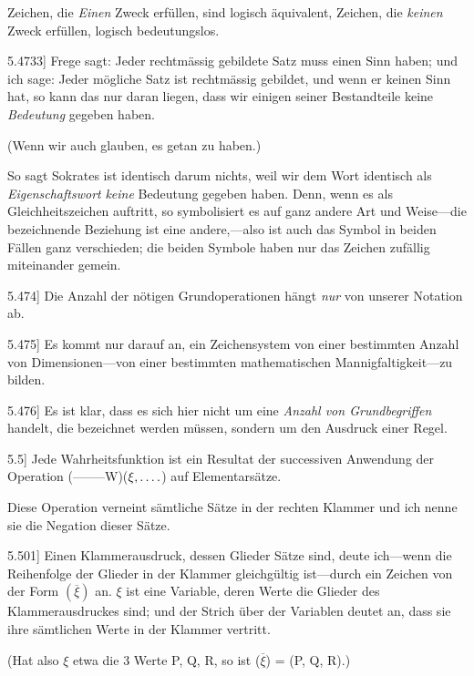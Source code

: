 \documentclass[12pt,oneside]{book}[2007/10/19]
\newcommand{\PropERef}[1]{\hyperref[PropE:#1]{#1}}
\newcommand{\PropositionG}[2]{%
  \item[\phantomsection\label{PropG:#1}\PropERef{#1}] #2%
}
\newcommand{\Emph}[1]{\emph{#1}}%
\newcommand{\fourdots}{\mathinner{\ldotp\ldotp\ldotp\ldotp}}
\newcommand{\AllowBreak}{\discretionary{}{}{}}
\begin{document}
\begin{propositions}
{Zeichen, die \Emph{Einen} Zweck erfüllen, sind logisch
äquivalent, Zeichen, die \Emph{keinen} Zweck erfüllen,
logisch bedeutungslos.}


\PropositionG{5.4733}
{Frege sagt: Jeder rechtmässig gebildete Satz
muss einen Sinn haben; und ich sage: Jeder
mögliche Satz ist rechtmässig gebildet, und wenn er
keinen Sinn hat, so kann das nur daran liegen, dass
wir einigen seiner Bestandteile keine \Emph{Bedeutung}
gegeben haben.

(Wenn wir auch glauben, es getan zu haben.)

So sagt \glqq{}Sokrates ist identisch\grqq{} darum nichts,
weil wir dem Wort \glqq{}identisch\grqq{} als \Emph{Eigenschaftswort}
\Emph{keine} Bedeutung gegeben haben. Denn,
wenn es als Gleichheitszeichen auftritt, so symbolisiert
es auf ganz andere Art und Weise---die
bezeichnende Beziehung ist eine an\-de\-re,---also ist
auch das Symbol in beiden Fällen ganz verschieden;
die beiden Symbole haben nur das Zeichen zufällig
miteinander gemein.}


\PropositionG{5.474}
{Die Anzahl der nötigen Grundoperationen hängt
\Emph{nur} von unserer Notation ab.}


\PropositionG{5.475}
{Es kommt nur darauf an, ein Zeichensystem von
einer bestimmten Anzahl von Dimensionen---von
einer bestimmten mathematischen Man\-nig\-fal\-tig\-keit---zu
bilden.}


\PropositionG{5.476}
{Es ist klar, dass es sich hier nicht um eine
\Emph{Anzahl von Grundbegriffen} handelt, die
bezeichnet werden müssen, sondern um den
Ausdruck einer Regel.}


\PropositionG{5.5}
{Jede Wahrheitsfunktion ist ein Resultat der
successiven Anwendung der Operation \mbox{(--\;--\;--\;--\;--W)}\AllowBreak($\xi, \fourdots$)
auf Elementarsätze.

Diese Operation verneint sämtliche Sätze in der
rechten Klammer und ich nenne sie die Negation
dieser Sätze.}


\PropositionG{5.501}
{Einen Klammerausdruck, dessen Glieder Sätze
sind, deute ich\AllowBreak---wenn die Reihenfolge der Glieder in
der Klammer gleichgültig ist---durch ein Zeichen von
der Form \glqq{}$(\overline{\xi})$\grqq{} an. \glqq{}$\xi$\grqq{} ist eine Variable, deren Werte
die Glieder des Klammerausdruckes sind; und der
Strich über der Variablen deutet an, dass sie ihre
sämtlichen Werte in der Klammer vertritt.

(Hat also $\xi$ etwa die 3 Werte P, Q, R, so ist
($\overline{\xi}$) = (P, Q, R).)

}
\end{propositions}
\end{document}
